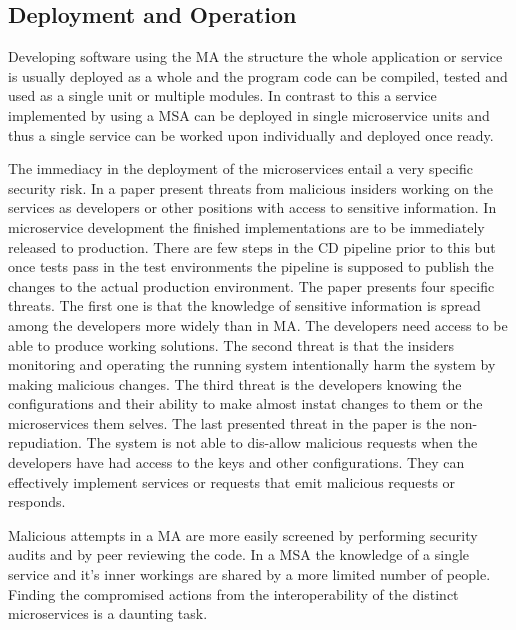 \begin{sloppypar}
\subsection{Deployment and Operation}
\begin{sloppypar}
    Developing software using the MA the structure the whole application or service 
    is usually deployed as a whole and the program code can be compiled, tested 
    and used as a single unit or multiple modules. In contrast to this a service 
    implemented by using a MSA can be deployed in single microservice units and 
    thus a single service can be worked upon individually and deployed once ready.
\end{sloppypar}
\begin{sloppypar}
    The immediacy in the deployment of the microservices entail a very specific 
    security risk. In a paper \citet{integinside} present threats from malicious 
    insiders working on the services as developers or other positions with access
    to sensitive information. In microservice development the finished 
    implementations are to be immediately released to production. There are few 
    steps in the CD pipeline prior to this but once tests pass in the test 
    environments the pipeline is supposed to publish the changes to the actual 
    production environment. The paper presents four specific threats. The first 
    one is that the knowledge of sensitive information is spread among the 
    developers more widely than in MA. The developers need access to be able to 
    produce working solutions. The second threat is that the insiders 
    monitoring and operating the running system intentionally harm the system 
    by making malicious changes. The third threat is the developers knowing the 
    configurations and their ability to make almost instat changes to them or 
    the microservices them selves. The last presented threat in the paper is the 
    non-repudiation. The system is not able to dis-allow malicious requests 
    when the developers have had access to the keys and other configurations. 
    They can effectively implement services or requests that emit malicious 
    requests or responds.
\end{sloppypar}
\begin{sloppypar}
    Malicious attempts in a MA are more easily screened by performing security
    audits and by peer reviewing the code. In a MSA the knowledge of a single 
    service and it's inner workings are shared by a more limited number of people.
    Finding the compromised actions from the interoperability of the distinct 
    microservices is a daunting task.
\end{sloppypar}
\begin{sloppypar}
    

\end{sloppypar}
\end{sloppypar}
